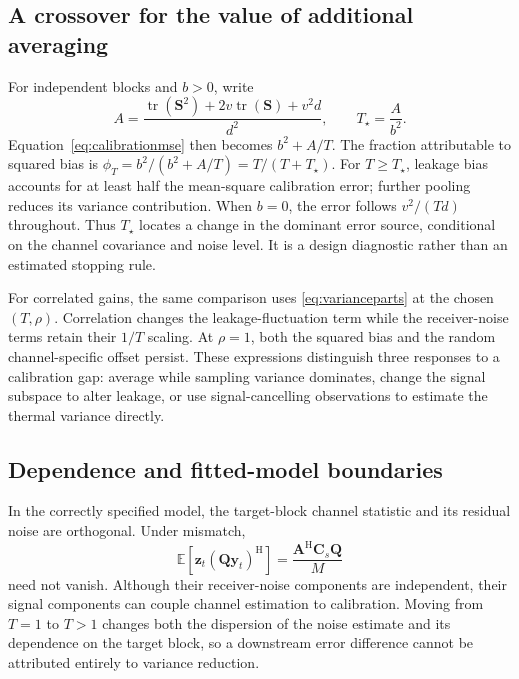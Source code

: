 \subsection{A crossover for the value of additional averaging}
\label{sec:crossover}
For independent blocks and $b>0$, write
\begin{equation}
 A=\frac{\operatorname{tr}(\mathbf S^2)+2v\operatorname{tr}(\mathbf S)+v^2d}{d^2},
 \qquad T_\star=\frac{A}{b^2}.
 \label{eq:crossover}
\end{equation}
Equation~\eqref{eq:calibrationmse} then becomes $b^2+A/T$.
The fraction attributable to squared bias is
$\phi_T=b^2/(b^2+A/T)=T/(T+T_\star)$.
For $T\geq T_\star$, leakage bias accounts for at least half the mean-square
calibration error; further pooling reduces its variance contribution. When $b=0$,
the error follows $v^2/(Td)$ throughout. Thus $T_\star$ locates a change in
the dominant error source, conditional on the channel covariance and noise
level. It is a design diagnostic rather than an estimated stopping rule.

For correlated gains, the same comparison uses
\eqref{eq:varianceparts} at the chosen $(T,\rho)$. Correlation changes the
leakage-fluctuation term while the receiver-noise terms retain their $1/T$
scaling. At $\rho=1$, both the squared bias and the random channel-specific
offset persist. These expressions distinguish three responses to a
calibration gap: average while sampling variance dominates, change the signal
subspace to alter leakage, or use signal-cancelling observations to estimate
the thermal variance directly.

\subsection{Dependence and fitted-model boundaries}
In the correctly specified model, the target-block channel statistic and its
residual noise are orthogonal. Under mismatch,
\begin{equation}
 \mathbb E[\mathbf z_t(\mathbf Q\mathbf y_t)^{\mathrm H}]
       =\frac{\mathbf A^{\mathrm H}\mathbf C_s\mathbf Q}{M}
 \label{eq:statisticdependence}
\end{equation}
need not vanish. Although their receiver-noise components are independent,
their signal components can couple channel estimation to calibration. Moving
from $T=1$ to $T>1$ changes both the dispersion of the noise estimate and its
dependence on the target block, so a downstream error difference cannot be
attributed entirely to variance reduction.


